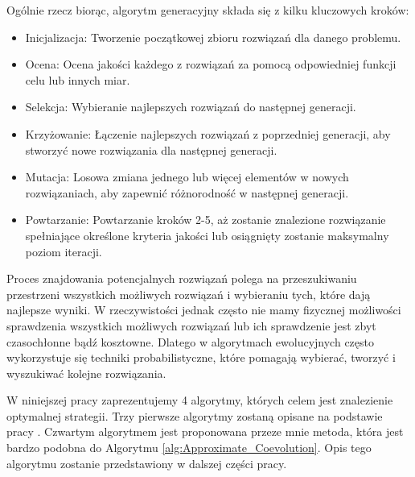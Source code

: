 \documentclass[inzynierska]{pwr_wmat_praca_dyplomowa}
\theoremstyle{plain}
\numberwithin{theorem}{chapter}
\theoremstyle{definition}
\numberwithin{theorem}{chapter}
\begin{document}
	Ogólnie rzecz biorąc, algorytm generacyjny składa się z kilku kluczowych kroków:
	\begin{itemize}
		\item Inicjalizacja: Tworzenie początkowej zbioru rozwiązań dla danego problemu.
		\item Ocena: Ocena jakości każdego z rozwiązań za pomocą odpowiedniej funkcji celu lub innych miar.
		\item Selekcja: Wybieranie najlepszych rozwiązań do następnej generacji.
		\item Krzyżowanie: Łączenie najlepszych rozwiązań z poprzedniej generacji, aby stworzyć nowe rozwiązania dla następnej generacji.
		\item Mutacja: Losowa zmiana jednego lub więcej elementów w nowych rozwiązaniach, aby zapewnić różnorodność w następnej generacji.
		\item Powtarzanie: Powtarzanie kroków 2-5, aż zostanie znalezione rozwiązanie spełniające określone kryteria jakości lub osiągnięty zostanie maksymalny poziom iteracji.
	\end{itemize}	
	Proces znajdowania potencjalnych rozwiązań polega na przeszukiwaniu przestrzeni wszystkich możliwych rozwiązań i wybieraniu tych, które dają najlepsze wyniki. W rzeczywistości jednak często nie mamy fizycznej możliwości sprawdzenia wszystkich możliwych rozwiązań lub ich sprawdzenie jest zbyt czasochłonne bądź kosztowne. Dlatego w algorytmach ewolucyjnych często wykorzystuje się techniki probabilistyczne, które pomagają wybierać, tworzyć i wyszukiwać kolejne rozwiązania.
	
	W niniejszej pracy zaprezentujemy 4 algorytmy, których celem jest znalezienie optymalnej strategii. Trzy pierwsze algorytmy zostaną opisane na podstawie pracy \cite{cauwet2018surprising}. Czwartym algorytmem jest proponowana przeze mnie metoda, która jest bardzo podobna do Algorytmu \ref{alg:Approximate_Coevolution}. Opis tego algorytmu zostanie przedstawiony w dalszej części pracy.
\end{document}
